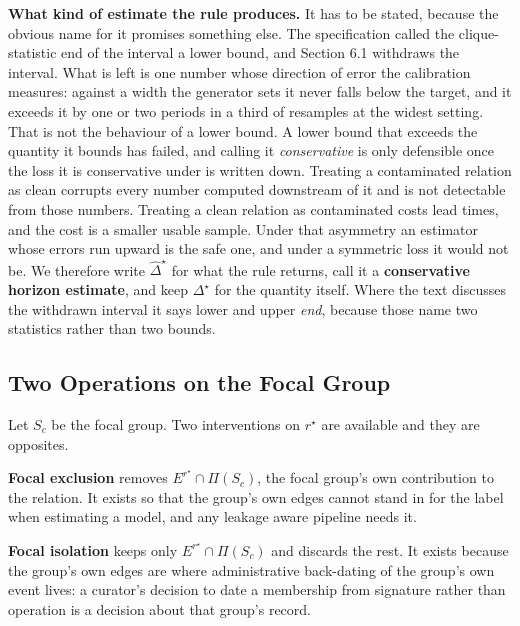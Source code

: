\documentclass[twoside,11pt]{article}
\begin{document}
\textbf{What kind of estimate the rule produces.} It has to be stated, because the obvious name for it promises something else. The specification called the clique-statistic end of the interval a lower bound, and Section 6.1 withdraws the interval. What is left is one number whose direction of error the calibration measures: against a width the generator sets it never falls below the target, and it exceeds it by one or two periods in a third of resamples at the widest setting. That is not the behaviour of a lower bound. A lower bound that exceeds the quantity it bounds has failed, and calling it \emph{conservative} is only defensible once the loss it is conservative under is written down. Treating a contaminated relation as clean corrupts every number computed downstream of it and is not detectable from those numbers. Treating a clean relation as contaminated costs lead times, and the cost is a smaller usable sample. Under that asymmetry an estimator whose errors run upward is the safe one, and under a symmetric loss it would not be. We therefore write \({\widehat{\Delta}}^{\star}\) for what the rule returns, call it a \textbf{conservative horizon estimate}, and keep \(\Delta^{\star}\) for the quantity itself. Where the text discusses the withdrawn interval it says lower and upper \emph{end}, because those name two statistics rather than two bounds.

\subsection{Two Operations on the Focal Group}

Let \(S_{c}\) be the focal group. Two interventions on \(r^{\star}\) are available and they are opposites.

\textbf{Focal exclusion} removes \(E^{r^{\star}} \cap \Pi(S_{c})\), the focal group's own contribution to the relation. It exists so that the group's own edges cannot stand in for the label when estimating a model, and any leakage aware pipeline needs it.

\textbf{Focal isolation} keeps only \(E^{r^{\star}} \cap \Pi(S_{c})\) and discards the rest. It exists because the group's own edges are where administrative back-dating of the group's own event lives: a curator's decision to date a membership from signature rather than operation is a decision about that group's record.
\end{document}
